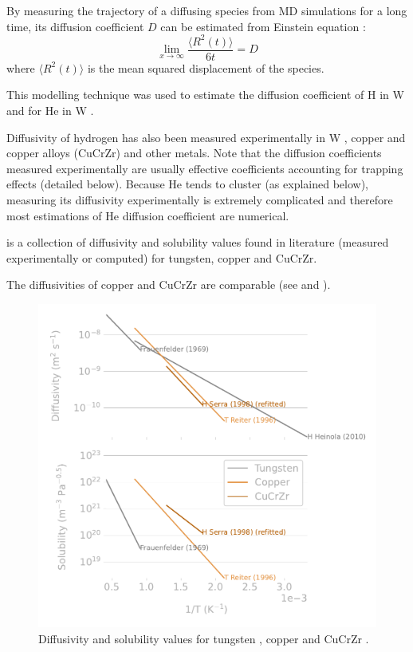 By measuring the trajectory of a diffusing species from MD simulations for a long time, its diffusion coefficient $D$ can be estimated from Einstein equation \cite{einstein_uber_1905}:
\begin{equation}
    \lim_{x\to\infty} \frac{\langle R^2(t) \rangle}{6t} = D
\end{equation}
where $\langle R^2(t) \rangle$ is the mean squared displacement of the species.

This modelling technique was used to estimate the diffusion coefficient of H in W  and for He in W .

Diffusivity of hydrogen has also been measured experimentally in W , copper and copper alloys (CuCrZr)  and other metals.
Note that the diffusion coefficients measured experimentally are usually effective coefficients accounting for trapping effects (detailed below).
Because He tends to cluster (as explained below), measuring its diffusivity experimentally is extremely complicated and therefore most estimations of He diffusion coefficient are numerical.

 is a collection of diffusivity and solubility values found in literature (measured experimentally or computed) for tungsten, copper and CuCrZr.

The diffusivities of copper and CuCrZr are comparable (see  and ).

\begin{figure}
    \centering
    \includegraphics[width=0.75\linewidth]{Figures/Chapter1/materials_properties_review_comparison.pdf}
    \caption{Diffusivity and solubility values for tungsten \cite{heinola_first-principles_2010, frauenfelder_solution_1969}, copper \cite{reiter_compilation_1996} and CuCrZr \cite{serra_hydrogen_1998}.}
\end{figure}

